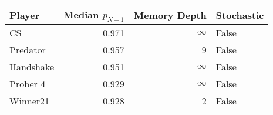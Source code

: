 \begin{tabular}{lrrl}
\toprule
    Player &  Median $p_{N-1}$ &  Memory Depth & Stochastic \\
\midrule
        CS &             0.971 &            \(\infty\) &      False \\
  Predator &             0.957 &             9 &      False \\
 Handshake &             0.951 &            \(\infty\) &      False \\
  Prober 4 &             0.929 &            \(\infty\) &      False \\
  Winner21 &             0.928 &             2 &      False \\
\bottomrule
\end{tabular}

